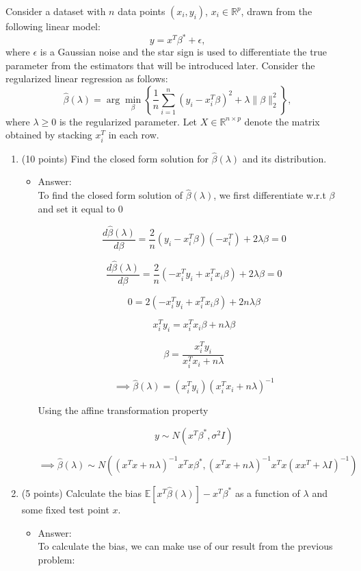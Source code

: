 \documentclass[twoside,12pt]{article}
\begin{document}
\begin{enumerate}
Consider a dataset with $n$ data points $(x_i, y_i)$, $x_i \in \mathbb R^p$, drawn from the following linear model:
\[
y = x^T {\beta^*} + \epsilon,
\]
where $\epsilon$ is a Gaussian noise and the star sign is used to differentiate the true parameter from the estimators that will be introduced later. Consider the regularized linear regression as follows:
\[
\hat \beta(\lambda) 
= \arg\min_{\beta}
\left\{
\frac 1 n \sum_{i=1}^n (y_i -x_i^T \beta)^2 + \lambda \|\beta\|_2^2
\right\},
\]
where $\lambda \geq 0$ is the regularized parameter. Let $X\in \mathbb R^{n\times p}$ denote the matrix obtained by stacking $x_i^T$ in each row. 
\begin{enumerate}
\item (10 points) Find the closed form solution for $\hat \beta(\lambda)$ and its distribution.
\begin{itemize}
\item Answer:\\
To find the closed form solution of $\hat \beta(\lambda)$, we first differentiate w.r.t $\beta$ and set it equal to $0$

$$\frac{d\hat \beta(\lambda)}{d \beta} = \frac{2}{n} (y_i	- x_i^T \beta)(-x_i^T) + 2 \lambda \beta = 0$$

$$\frac{d\hat \beta(\lambda)}{d \beta} = \frac{2}{n} (-x_i^Ty_i + x_i^Tx_i\beta) + 2\lambda \beta = 0$$

$$0 = 2 (-x_i^Ty_i + x_i^Tx_i\beta) + 2n\lambda \beta$$

$$x_i^Ty_i =  x_i^Tx_i\beta + n\lambda \beta$$

$$ \beta = \frac{x_i^Ty_i}{x_i^Tx_i + n\lambda }$$

$$ \implies  \hat \beta (\lambda) = (x_i^Ty_i)(x_i^Tx_i + n\lambda)^{-1}$$

Using the affine transformation property

$$ y \sim N(x^T\beta^*,\sigma^2 I)  $$

$$\implies  \hat \beta (\lambda) \sim N((x^Tx + n\lambda)^{-1}x^Tx\beta^*,(x^Tx + n\lambda)^{-1} x^T x(xx^T + \lambda	I)^{-1} )$$
$$$$

\end{itemize}
\item (5 points) Calculate the bias  $\mathbb E[x^T {\hat \beta}(\lambda)] - x^T {\beta^*}$ as a function of $\lambda$ and some fixed test point $x$.

\begin{itemize}
\item Answer:\\
To calculate the bias, we can make use of our result from the previous problem:


\end{itemize}
\end{enumerate}
\end{enumerate}
\end{document}

